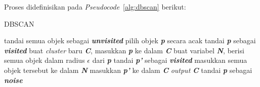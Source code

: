 Proses didefinisikan pada \textit{Pseudocode}~\ref{alg:dbscan} berikut: \\
\begin{algorithm}[H]
	\caption{DBSCAN}
	\label{alg:dbscan}
	\begin{algorithmic}[1]
		\STATE tandai semua objek sebagai \textit{\textbf{unvisited}}
		\STATE pilih objek \textit{\textbf{p}} secara acak
		\STATE tandai \textit{\textbf{p}} sebagai \textit{\textbf{visited}}
		\STATE buat \textit{cluster} baru \textit{\textbf{C}}, masukkan \textit{\textbf{p}} ke dalam \textit{\textbf{C}}
		\STATE buat variabel \textit{\textbf{N}}, berisi semua objek dalam radius $\epsilon$ dari \textit{\textbf{p}}
		\STATE tandai \textit{\textbf{p'}} sebagai \textit{\textbf{visited}}
		\STATE masukkan semua objek tersebut ke dalam \textit{\textbf{N}}
		\ENDIF
		\STATE masukkan \textit{\textbf{p'}} ke dalam \textit{\textbf{C}}
		\ENDIF
		\ENDIF
		\ENDFOR
		\STATE \textit{output} \textit{\textbf{C}}
		\ELSE
		\STATE tandai \textit{\textbf{p}} sebagai \textit{\textbf{noise}}
		\ENDIF
		\ENDWHILE
	\end{algorithmic}
\end{algorithm}
 